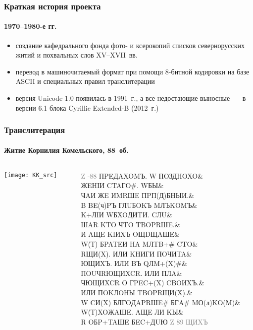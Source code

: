\frame{\titlepage}

\begin{frame}
  \frametitle{Краткая история проекта}
  \framesubtitle{1970--1980-е гг.}

  \begin{block}{}
    \begin{itemize}
      \item создание кафедрального фонда фото- и ксерокопий списков севернорусских житий и похвальных слов XV--XVII~вв.\autocite{averina_alexeeva_gerd:1996}
      \item перевод в машиночитаемый формат при помощи 8-битной кодировки на базе ASCII и специальных правил транслитерации
      \item версия Unicode 1.0 появилась в 1991~г., а все недостающие выносные~--- в версии 6.1 блока Cyrillic Extended-B (2012~г.)
    \end{itemize}
  \end{block}
\end{frame}

\begin{frame}
  \frametitle{Транслитерация}
  \framesubtitle{Житие Корнилия Комельского, 88~об.}

  \begin{columns}[c]
    \begin{column}{6cm}
      \texttt{[image: KK\_src]}
    \end{column}

    \begin{column}{6cm} \ttfamily \footnotesize
      \textcolor{gray}{Z -88} ПPEДAXOMЪ. W ПOЗДHOXO\& \\
      ЖEHIИ CTAГO\#. WБЫ\& \\
      ЧAИ ЖE ИMRШE ПPП(Д)БHЫИ.\& \\
      B BE(ч)PЪ ГЛUБOKЪ MЛЪKOMЪ\& \\
      K+ЛIИ WБXOДИTИ. CЛU\& \\
      ШAR KTO ЧTO TBOPRШE.\& \\
      И AЩE KIИXЪ OЩDЩAШE\& \\
      W(Т) БPATEИ HA MЛTB+\# CTO\& \\
      RЩИ(X). ИЛИ KHИГИ ПOЧИTA\& \\
      ЮЩИXЪ. ИЛИ BЪ QЛM+(X)\#\& \\
      ПOUЧRЮЩИXCR. ИЛИ ПЛA\& \\
      ЧЮЩИXCR O ГPEC+(X) CBOИXЪ.\& \\
      ИЛИ ПOKЛOHЫ TBOPRЩИ(X).\& \\
      W CИ(X) БЛГOДAPRШE\# БГA\# MО(л)KO(M)\& \\
      W(Т)XOЖAШE. AЩE ЛИ KЫ\& \\
      R OБP+TAШE БEC+ДUЮ \textcolor{gray}{Z 89 ЩИXЪ}
    \end{column}
  \end{columns}
\end{frame}

